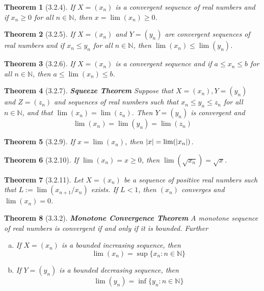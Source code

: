 \documentclass{article}
\newtheorem*{theorem}{Theorem}
\DeclarePairedDelimiter\abs{\lvert}{\rvert}%
\begin{document}
\begin{theorem}[3.2.4] If $X=(x_n)$ is a convergent sequence of real numbers and if $x_n\ge{0}$
  for all $n \in{\mathbb{N}}$, then $x=\lim{(x_n)}\ge{0}$.
\end{theorem}

\begin{theorem}[3.2.5] If $X=(x_n)$ and $Y=(y_n)$ are convergent sequences of real numbers
  and if $x_n\le{y_n}$ for all $n \in{\mathbb{N}}$, then $\lim(x_n)\le{\lim(y_n)}$.
\end{theorem}

\begin{theorem}[3.2.6] If $X=(x_n)$ is a convergent sequence and if $a\le{x_n}\le{b}$ for all
  $n \in{\mathbb{N}}$, then $a\le{\lim(x_n)}\le{b}$.
\end{theorem}

\begin{theorem}[3.2.7] \textbf{Squeeze Theorem} Suppose that $X=(x_n), Y=(y_n)$ and $Z=(z_n)$
  and sequences of real numbers such that $x_n\le{y_n}\le{z_n}$ for all $n \in{\mathbb{N}}$,
  and that $\lim(x_n)=\lim(z_n)$. Then $Y=(y_n)$ is convergent and
  $$\lim(x_n)=\lim(y_n)=\lim(z_n)$$
\end{theorem}

\begin{theorem}[3.2.9] If $x=\lim(x_n)$, then $\abs{x}=\lim(\abs{x_n})$.
\end{theorem}

\begin{theorem}[3.2.10] If $\lim(x_n)=x\ge{0}$, then $\lim(\sqrt{x_n})=\sqrt{x}$.
\end{theorem}

\begin{theorem}[3.2.11] Let $X=(x_n)$ be a sequence of positive real numbers
  such that $L:=\lim(x_{n+1}/x_n)$ exists. If $L<1$, then $(x_n)$ converges and 
  $\lim(x_n)=0$.
\end{theorem}

\begin{theorem}[3.3.2] \textbf{Monotone Convergence Theorem} A monotone sequence of real
  numbers is convergent if and only if it is bounded. Further
  \begin{enumerate}[(a)]
    \item If $X=(x_n)$ is a bounded increasing sequence, then
      $$\lim(x_n)=\sup\{x_n:n \in{\mathbb{N}}\}$$
    \item If $Y=(y_n)$ is a bounded decreasing sequence, then
      $$\lim(y_n)=\inf\{y_n:n \in{\mathbb{N}}\}$$
  \end{enumerate}
\end{theorem}
\end{document}
